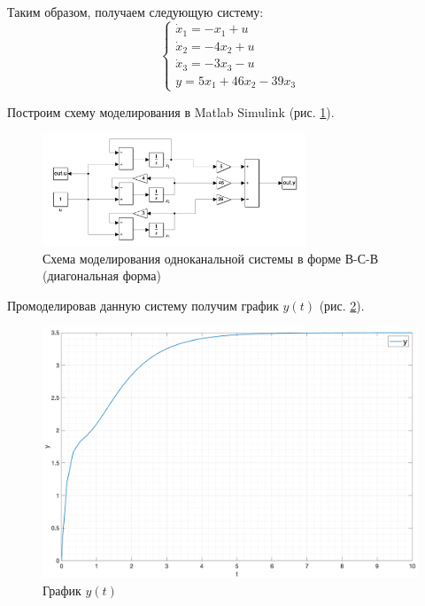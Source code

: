 Таким образом, получаем следующую систему:
\begin{equation}
    \begin{cases}
        \dot{x}_1 = -x_1 + u\\
        \dot{x}_2 = -4x_2 + u\\
        \dot{x}_3 = -3x_3 - u \\
        y = 5x_1 + 46x_2 - 39x_3
    \end{cases}
\end{equation}


Построим схему моделирования в Matlab Simulink (рис. \ref{fig:model4}).

\begin{figure}[ht!]
    \centering
    \includegraphics[width=0.7\textwidth]{media/system4.png}
    \caption{Схема моделирования одноканальной системы в форме В-С-В (диагональная форма)}
    \label{fig:model4}
\end{figure}

Промоделировав данную систему получим график $y(t)$ (рис. \ref{fig:yt4}).

\begin{figure}[ht!]
    \centering
    \includegraphics[width=\textwidth]{media/sys4_y(t).png}
    \caption{График $y(t)$}
    \label{fig:yt4}
\end{figure}


